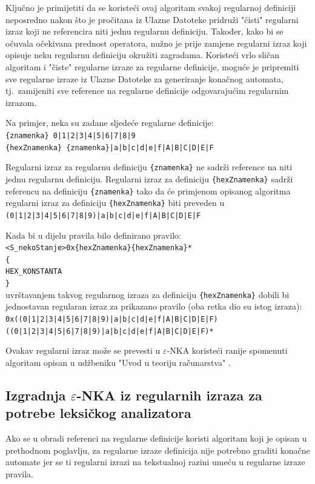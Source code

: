 \documentclass[times, 12pt, utf8]{book}
\begin{document}
Ključno je primijetiti da se koristeći ovaj algoritam svakoj regularnoj definiciji neposredno nakon što je pročitana iz Ulazne Datoteke pridruži "čisti" regularni izraz koji ne referencira niti jednu regularnu definiciju.
Također, kako bi se očuvala očekivana prednost operatora, nužno je prije zamjene regularni izraz koji opisuje neku regularnu definiciju okružiti zagradama.
Koristeći vrlo sličan algoritam i "čiste" regularne izraze za regularne definicije, moguće je pripremiti sve regularne izraze iz Ulazne Datoteke za generiranje konačnog automata, tj.~zamijeniti sve reference na regularne definicije odgovarajućim regularnim izrazom.

Na primjer, neka su zadane sljedeće regularne definicije:\\
\verb={znamenka} 0|1|2|3|4|5|6|7|8|9=\\
\verb={hexZnamenka} {znamenka}|a|b|c|d|e|f|A|B|C|D|E|F=

Regularni izraz za regularnu definiciju \verb|{znamenka}| ne sadrži reference na niti jednu regularnu definiciju.
Regularni izraz za definiciju \verb|{hexZnamenka}| sadrži referencu na definiciju \verb|{znamenka}| tako da će primjenom opisanog algoritma regularni izraz za definiciju \verb|{hexZnamenka}| biti preveden u \verb=(0|1|2|3|4|5|6|7|8|9)|a|b|c|d|e|f|A|B|C|D|E|F=

Kada bi u dijelu pravila bilo definirano pravilo:\\
\verb=<S_nekoStanje>0x{hexZnamenka}{hexZnamenka}*=\\
\verb={=\\
\verb=HEX_KONSTANTA=\\
\verb=}=\\
uvrštavanjem takvog regularnog izraza za definiciju \verb|{hexZnamenka}| dobili bi jednostavan regularan izraz za prikazano pravilo (oba retka dio su istog izraza):\\
\verb=0x((0|1|2|3|4|5|6|7|8|9)|a|b|c|d|e|f|A|B|C|D|E|F)=\\
\verb=((0|1|2|3|4|5|6|7|8|9)|a|b|c|d|e|f|A|B|C|D|E|F)*=

Ovakav regularni izraz može se prevesti u \(\varepsilon\)-NKA koristeći ranije spomenuti algoritam opisan u udžbeniku "Uvod u teoriju računarstva" \cite[poglavlje 2.2.2]{utr}.

\subsection{Izgradnja $\varepsilon$-NKA iz regularnih izraza za potrebe leksičkog analizatora}
Ako se u obradi referenci na regularne definicije koristi algoritam koji je opisan u prethodnom poglavlju, za regularne izraze definicija nije potrebno graditi konačne automate jer se ti regularni izrazi na tekstualnoj razini umeću u regularne izraze pravila.
\end{document}
